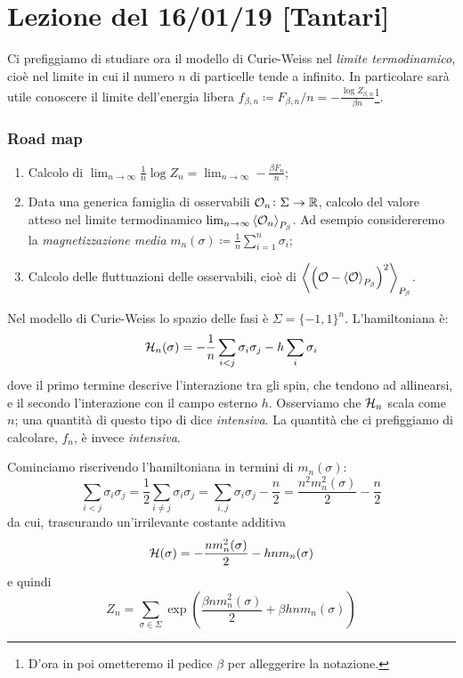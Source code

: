 \section{Lezione del 16/01/19 [Tantari]}
Ci prefiggiamo di studiare ora il modello di Curie-Weiss nel \emph{limite termodinamico}, cioè nel limite in cui il numero $ n $ di particelle tende a infinito. In particolare sarà utile conoscere il limite dell'energia libera $ f_{\beta, n} \coloneqq F_{\beta, n}/n = -\frac{\log Z_{\beta, n}}{\beta n}$\footnote{D'ora in poi ometteremo il pedice $ \beta $ per alleggerire la notazione.}.

\subsubsection{Road map}
\begin{enumerate}
  \item Calcolo di $ \lim_{n\to\infty} \frac{1}{n} \log{Z_n} = \lim_{n\to\infty} -\frac{\beta F_n}{n} $;
  \item Data una generica famiglia di osservabili $ \mathcal{O}_n\colon\Sigma\to\mathbb{R} $, calcolo del valore atteso nel limite termodinamico $ \lim_{n\to\infty} \left< \mathcal{O}_n \right>_{P_\beta} $. Ad esempio considereremo la \emph{magnetizzazione media} $ m_n(\sigma) \coloneqq \frac{1}{n}\sum_{i=1}^{n}\sigma_i $;
  \item Calcolo delle fluttuazioni delle osservabili, cioè di $ \left<  \left(\mathcal{O} - \left< \mathcal{O} \right>_{P_\beta} \right)^2  \right>_{P_\beta} $.
\end{enumerate}

Nel modello di Curie-Weiss lo spazio delle fasi è $ \Sigma = \{-1,1\}^n $. L'hamiltoniana è:
\[ \mathcal{H}_n(\sigma) = -\frac{1}{n} \sum_{i<j} \sigma_i \sigma_j - h \sum_i \sigma_i \]
dove il primo termine descrive l'interazione tra gli spin, che tendono ad allinearsi, e il secondo l'interazione con il campo esterno $ h $. Osserviamo che $ \mathcal{H}_n $ scala come $ n $; una quantità di questo tipo di dice \emph{intensiva}. La quantità che ci prefiggiamo di calcolare, $ f_n $, è invece \emph{intensiva}.

Cominciamo riscrivendo l'hamiltoniana in termini di $ m_n(\sigma) $:
\[ \sum_{i<j} \sigma_i \sigma_j = \frac{1}{2} \sum_{i \neq j} \sigma_i \sigma_j = \sum_{i,j} \sigma_i \sigma_j -\frac{n}{2} = \frac{n^2 m_n^2(\sigma)}{2} - \frac{n}{2} \]
da cui, trascurando un'irrilevante costante additiva
\[ \mathcal{H}(\sigma) = -\frac{n m_n^2(\sigma)}{2} - hnm_n(\sigma) \]
e quindi
\[ Z_n = \sum_{\sigma \in \Sigma} \exp\left( \frac{\beta n m_n^2(\sigma)}{2} + \beta h n m_n(\sigma) \right) \]

